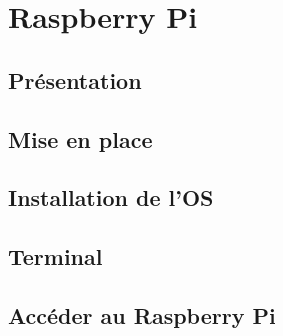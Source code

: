 \documentclass[12pt,a4paper,oneside]{report}
\begin{document}










\chapter{Raspberry Pi}

\section{Présentation}


\section{Mise en place}


\section{Installation de l'OS}


\section{Terminal}


\section{Accéder au Raspberry Pi}


%
\end{document}
